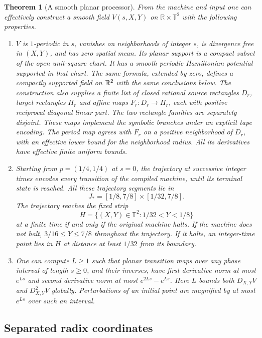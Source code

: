 \documentclass[11pt]{article}
\newtheorem{theorem}{Theorem}[section]
\theoremstyle{remark}\newtheorem{remark}[theorem]{Remark}
\begin{document}
\begin{theorem}[A smooth planar processor]\label{thm:planar-processor}
From the machine and input one can effectively construct a smooth
field $V(s,X,Y)$ on $\mathbb R\times\mathbb T^2$ with the following
properties.
\begin{enumerate}
\item $V$ is $1$-periodic in $s$, vanishes on neighborhoods of integer
$s$, is divergence free in $(X,Y)$, and has zero spatial mean.
Its planar support is a compact subset of the open unit-square chart.
It has a smooth periodic Hamiltonian potential supported in that chart.
The same formula, extended by zero, defines a compactly supported field
on $\mathbb R^2$ with the same conclusions below. The construction also
supplies a finite list of closed rational source rectangles $D_r$, target
rectangles $H_r$ and affine maps $F_r:D_r\to H_r$, each with positive
reciprocal diagonal linear part. The two rectangle families are
separately disjoint. These maps implement the symbolic branches under
an explicit tape encoding. The period map agrees with $F_r$ on a
positive neighborhood of $D_r$, with an effective lower bound for
the neighborhood radius.
All its derivatives have effective finite uniform bounds.
\item Starting from $p=(1/4,1/4)$ at $s=0$, the trajectory at successive
integer times encodes every transition of the compiled machine, until
its terminal state is reached.  All these trajectory segments lie in
\[
 J_*=[1/8,7/8]\times[1/32,7/8].
\]
The trajectory reaches the fixed strip
\[
 H=\{(X,Y)\in\mathbb T^2:1/32<Y<1/8\}
\]
at a finite time if and only if the original machine halts.  If the
machine does not halt, $3/16\le Y\le7/8$ throughout the trajectory.
If it halts, an integer-time point lies in $H$ at distance at least
$1/32$ from its boundary.
\item One can compute $L\ge1$ such that planar transition maps over
any phase interval of length $s\ge0$, and their inverses, have first
derivative norm at most $e^{Ls}$ and second derivative norm at most
$e^{2Ls}-e^{Ls}$. Here $L$ bounds both $D_{X,Y}V$ and
$D_{X,Y}^2V$ globally. Perturbations of an initial point are magnified by at most
$e^{Ls}$ over such an interval.
\end{enumerate}
\end{theorem}

\subsection{Separated radix coordinates}
\end{document}
